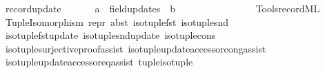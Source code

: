 \begin{isabellebody}
\ \ {\isachardoublequoteopen}{\isacharunderscore}{\kern0pt}record{\isacharunderscore}{\kern0pt}update{\isachardoublequoteclose}\ \ \ \ \ \ {\isacharcolon}{\kern0pt}{\isacharcolon}{\kern0pt}\ {\isachardoublequoteopen}{\isacharprime}{\kern0pt}a\ {\isacharequal}{\kern0pt}{\isachargreater}{\kern0pt}\ field{\isacharunderscore}{\kern0pt}updates\ {\isacharequal}{\kern0pt}{\isachargreater}{\kern0pt}\ {\isacharprime}{\kern0pt}b{\isachardoublequoteclose}\ \ \ \ \ \ \ \ \ \ {\isacharparenleft}{\kern0pt}{\isachardoublequoteopen}{\isacharunderscore}{\kern0pt}{\isacharslash}{\kern0pt}{\isacharparenleft}{\kern0pt}{}{\isacharprime}{\kern0pt}{\isacharparenleft}{\kern0pt}{\isacharbar}{\kern0pt}\ {\isacharunderscore}{\kern0pt}\ {\isacharbar}{\kern0pt}{\isacharprime}{\kern0pt}{\isacharparenright}{\kern0pt}{\isacharparenright}{\kern0pt}{\isachardoublequoteclose}\ {\isacharbrackleft}{\kern0pt}{}{}{}{\isacharcomma}{\kern0pt}\ {}{\isacharbrackright}{\kern0pt}\ {}{}{}{\isacharparenright}{\kern0pt}%
\isadelimdocument
%
\endisadelimdocument
%
\isatagdocument
%
\isamarkuptrue%
%
\endisatagdocument
{\isafolddocument}%
%
\isadelimdocument
%
\endisadelimdocument
%
\isadelimML
%
\endisadelimML
%
\isatagML
{}\isamarkupfalse%
\ {\isacartoucheopen}Tools{\isacharslash}{\kern0pt}record{\isachardot}{\kern0pt}ML{\isacartoucheclose}%
\endisatagML
{\isafoldML}%
%
\isadelimML
%
\endisadelimML
\isanewline
\isanewline
{}\isamarkupfalse%
\ {\isacharparenleft}{\kern0pt}\ Tuple{\isacharunderscore}{\kern0pt}Isomorphism\ repr\ abst\ iso{\isacharunderscore}{\kern0pt}tuple{\isacharunderscore}{\kern0pt}fst\ iso{\isacharunderscore}{\kern0pt}tuple{\isacharunderscore}{\kern0pt}snd\isanewline
\ \ iso{\isacharunderscore}{\kern0pt}tuple{\isacharunderscore}{\kern0pt}fst{\isacharunderscore}{\kern0pt}update\ iso{\isacharunderscore}{\kern0pt}tuple{\isacharunderscore}{\kern0pt}snd{\isacharunderscore}{\kern0pt}update\ iso{\isacharunderscore}{\kern0pt}tuple{\isacharunderscore}{\kern0pt}cons\isanewline
\ \ iso{\isacharunderscore}{\kern0pt}tuple{\isacharunderscore}{\kern0pt}surjective{\isacharunderscore}{\kern0pt}proof{\isacharunderscore}{\kern0pt}assist\ iso{\isacharunderscore}{\kern0pt}tuple{\isacharunderscore}{\kern0pt}update{\isacharunderscore}{\kern0pt}accessor{\isacharunderscore}{\kern0pt}cong{\isacharunderscore}{\kern0pt}assist\isanewline
\ \ iso{\isacharunderscore}{\kern0pt}tuple{\isacharunderscore}{\kern0pt}update{\isacharunderscore}{\kern0pt}accessor{\isacharunderscore}{\kern0pt}eq{\isacharunderscore}{\kern0pt}assist\ tuple{\isacharunderscore}{\kern0pt}iso{\isacharunderscore}{\kern0pt}tuple\isanewline
%
\isadelimtheory
\isanewline
%
\endisadelimtheory
%
\isatagtheory
{}\isamarkupfalse%
%
\endisatagtheory
{\isafoldtheory}%
%
\isadelimtheory
%
\endisadelimtheory
%
\end{isabellebody}%
